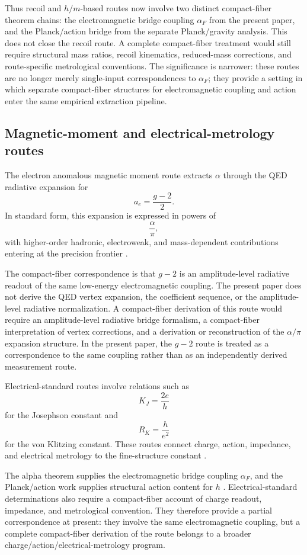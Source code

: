 Thus recoil and \(h/m\)-based routes now involve two distinct
compact-fiber theorem chains: the electromagnetic bridge coupling
\(\alpha_F\) from the present paper, and the Planck/action bridge from
the separate Planck/gravity analysis. This does not close the recoil
route. A complete compact-fiber treatment would still require structural
mass ratios, recoil kinematics, reduced-mass corrections, and
route-specific metrological conventions. The significance is narrower:
these routes are no longer merely single-input correspondences to
\(\alpha_F\); they provide a setting in which separate compact-fiber
structures for electromagnetic coupling and action enter the same
empirical extraction pipeline.

\subsection{Magnetic-moment and electrical-metrology routes}

The electron anomalous magnetic moment route extracts \(\alpha\) through
the QED radiative expansion for
\[
a_e=\frac{g-2}{2}.
\]
In standard form, this expansion is expressed in powers of
\[
\frac{\alpha}{\pi},
\]
with higher-order hadronic, electroweak, and mass-dependent
contributions entering at the precision frontier
\cite{Aoyama2019_electron_gminus2_review,Aoyama2012_tenth_order_QED}.

The compact-fiber correspondence is that \(g-2\) is an amplitude-level
radiative readout of the same low-energy electromagnetic coupling. The
present paper does not derive the QED vertex expansion, the coefficient
sequence, or the amplitude-level radiative normalization. A compact-fiber
derivation of this route would require an amplitude-level radiative
bridge formalism, a compact-fiber interpretation of vertex corrections,
and a derivation or reconstruction of the \(\alpha/\pi\) expansion
structure. In the present paper, the \(g-2\) route is treated as a
correspondence to the same coupling rather than as an independently
derived measurement route.

Electrical-standard routes involve relations such as
\[
K_J=\frac{2e}{h}
\]
for the Josephson constant and
\[
R_K=\frac{h}{e^2}
\]
for the von Klitzing constant. These routes connect charge, action,
impedance, and electrical metrology to the fine-structure constant
\cite{BIPM_SI_Brochure_9th}.

The alpha theorem supplies the electromagnetic bridge coupling
\(\alpha_F\), and the Planck/action work supplies structural action
content for \(h\) \cite{Wells2026PlanckGravity}. Electrical-standard
determinations also require a compact-fiber account of charge readout,
impedance, and metrological convention. They therefore provide a partial
correspondence at present: they involve the same electromagnetic
coupling, but a complete compact-fiber derivation of the route belongs to
a broader charge/action/electrical-metrology program.


